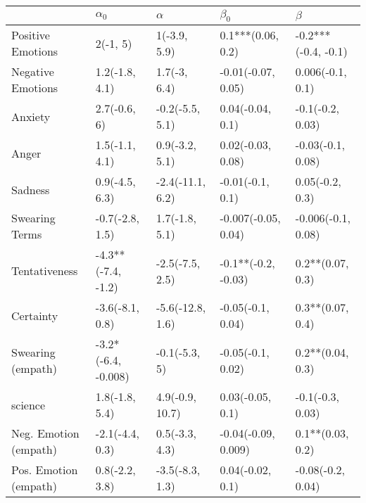 \begin{tabular}{lllll}
\toprule
{} &           $\alpha_0$ &          $\alpha$ &            $\beta_0$ &              $\beta$ \\
\midrule
Positive Emotions     &             2(-1, 5) &      1(-3.9, 5.9) &    0.1***(0.06, 0.2) &  -0.2***(-0.4, -0.1) \\
Negative Emotions     &       1.2(-1.8, 4.1) &      1.7(-3, 6.4) &   -0.01(-0.07, 0.05) &     0.006(-0.1, 0.1) \\
Anxiety               &         2.7(-0.6, 6) &   -0.2(-5.5, 5.1) &     0.04(-0.04, 0.1) &     -0.1(-0.2, 0.03) \\
Anger                 &       1.5(-1.1, 4.1) &    0.9(-3.2, 5.1) &    0.02(-0.03, 0.08) &    -0.03(-0.1, 0.08) \\
Sadness               &       0.9(-4.5, 6.3) &  -2.4(-11.1, 6.2) &     -0.01(-0.1, 0.1) &      0.05(-0.2, 0.3) \\
Swearing Terms        &      -0.7(-2.8, 1.5) &    1.7(-1.8, 5.1) &  -0.007(-0.05, 0.04) &   -0.006(-0.1, 0.08) \\
Tentativeness         &   -4.3**(-7.4, -1.2) &   -2.5(-7.5, 2.5) &  -0.1**(-0.2, -0.03) &     0.2**(0.07, 0.3) \\
Certainty             &      -3.6(-8.1, 0.8) &  -5.6(-12.8, 1.6) &    -0.05(-0.1, 0.04) &     0.3**(0.07, 0.4) \\
Swearing (empath)     &  -3.2*(-6.4, -0.008) &     -0.1(-5.3, 5) &    -0.05(-0.1, 0.02) &     0.2**(0.04, 0.3) \\
science               &       1.8(-1.8, 5.4) &   4.9(-0.9, 10.7) &     0.03(-0.05, 0.1) &     -0.1(-0.3, 0.03) \\
Neg. Emotion (empath) &      -2.1(-4.4, 0.3) &    0.5(-3.3, 4.3) &  -0.04(-0.09, 0.009) &     0.1**(0.03, 0.2) \\
Pos. Emotion (empath) &       0.8(-2.2, 3.8) &   -3.5(-8.3, 1.3) &     0.04(-0.02, 0.1) &    -0.08(-0.2, 0.04) \\
\bottomrule
\end{tabular}
